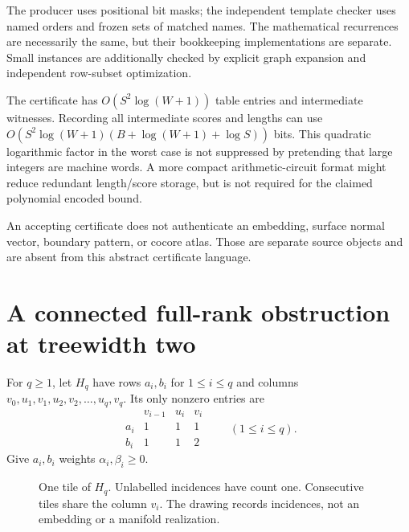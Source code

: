 \documentclass[11pt,a4paper]{article}
\theoremstyle{definition}
\theoremstyle{remark}
\begin{document}
The producer uses positional bit masks; the independent template checker
uses named orders and frozen sets of matched names. The mathematical
recurrences are necessarily the same, but their bookkeeping implementations
are separate. Small instances are additionally checked by explicit graph
expansion and independent row-subset optimization.

The certificate has $O(S^2\log(W+1))$ table entries and intermediate
witnesses. Recording all intermediate scores and lengths can use
$O(S^2\log(W+1)(B+\log(W+1)+\log S))$ bits. This quadratic logarithmic
factor in the worst case is not suppressed by pretending that large
integers are machine words. A more compact arithmetic-circuit format might
reduce redundant length/score storage, but is not required for the claimed
polynomial encoded bound.

An accepting certificate does not authenticate an embedding, surface
normal vector, boundary pattern, or cocore atlas. Those are separate source
objects and are absent from this abstract certificate language.

\section{A connected full-rank obstruction at treewidth two}
\label{sec:barrier}

For $q\geq1$, let $H_q$ have rows $a_i,b_i$ for $1\leq i\leq q$ and
columns $v_0,u_1,v_1,u_2,v_2,\ldots,u_q,v_q$. Its only nonzero entries are
\begin{equation}
\begin{array}{c|ccc}
 &v_{i-1}&u_i&v_i\\\hline
 a_i&1&1&1\\
 b_i&1&1&2
\end{array}
\qquad(1\leq i\leq q).
\label{eq:family}
\end{equation}
Give $a_i,b_i$ weights $\alpha_i,\beta_i\geq0$.

\begin{figure}[ht]
\centering
{}
\caption{One tile of $H_q$. Unlabelled incidences have count one. Consecutive
tiles share the column $v_i$. The drawing records incidences, not an
embedding or a manifold realization.}
\end{figure}
\end{document}
